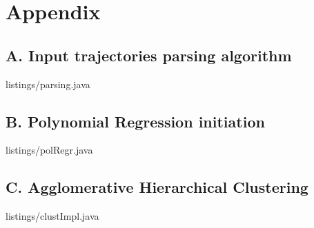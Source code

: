 \section*{Appendix}

\subsection*{A. Input trajectories parsing algorithm}
\lstset{style=code-style-java}
 {listings/parsing.java}

\subsection*{B. Polynomial Regression initiation}
 {listings/polRegr.java}

\subsection*{C. Agglomerative Hierarchical Clustering}
 {listings/clustImpl.java}
